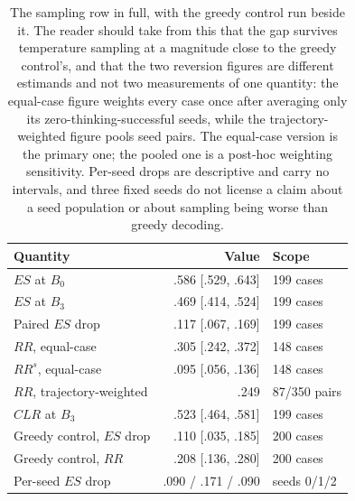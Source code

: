 \documentclass[letterpaper]{article}
\begin{document}
\begin{table}[t]
\centering
\small
\begin{tabular}{@{}lrl@{}}
\toprule
Quantity & Value & Scope \\
\midrule
\(ES\) at \(B_0\)        & .586 [.529, .643] & 199 cases \\
\(ES\) at \(B_3\)        & .469 [.414, .524] & 199 cases \\
Paired \(ES\) drop       & .117 [.067, .169] & 199 cases \\
\(RR\), equal-case       & .305 [.242, .372] & 148 cases \\
\(RR^s\), equal-case     & .095 [.056, .136] & 148 cases \\
\(RR\), trajectory-weighted & .249 & 87/350 pairs \\
\(CLR\) at \(B_3\)       & .523 [.464, .581] & 199 cases \\
\addlinespace
Greedy control, \(ES\) drop & .110 [.035, .185] & 200 cases \\
Greedy control, \(RR\)      & .208 [.136, .280] & 200 cases \\
\addlinespace
Per-seed \(ES\) drop     & .090 / .171 / .090 & seeds 0/1/2 \\
\bottomrule
\end{tabular}
\caption{The sampling row in full, with the greedy control run beside it.  The
reader should take from this that the gap survives temperature sampling at a
magnitude close to the greedy control's, and that the two reversion figures are
different estimands and not two measurements of one quantity: the equal-case
figure weights every case once after averaging only its zero-thinking-successful
seeds, while the trajectory-weighted figure pools seed pairs.  The equal-case
version is the primary one; the pooled one is a post-hoc weighting sensitivity.
Per-seed drops are descriptive and carry no intervals, and three fixed seeds do
not license a claim about a seed population or about sampling being worse than
greedy decoding.}
\label{tab:s8-sampling}
\end{table}
\end{document}
